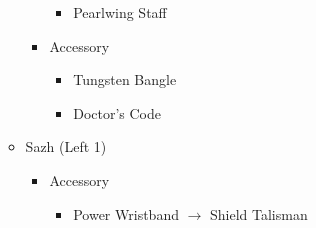 \begin{paracol}{2}
\begin{menu}
\begin{itemize}
\begin{itemize}
\begin{itemize}
\begin{itemize}
						            \item Pearlwing Staff
					            \end{itemize}
					      \item Accessory
					            \begin{itemize}
						            \item Tungsten Bangle
						            \item Doctor's Code
					            \end{itemize}
				      \end{itemize}
				\item Sazh (Left 1)
				      \begin{itemize}
					      \item Accessory
					            \begin{itemize}
						            \item Power Wristband $\rightarrow$ Shield Talisman
					            \end{itemize}
				      \end{itemize}
			\end{itemize}
		\end{itemize}
	\end{menu}



\end{paracol}
